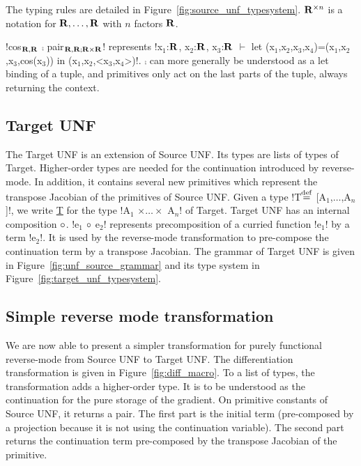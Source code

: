 The typing rules are detailed in Figure~\ref{fig:source_unf_typesystem}.
$\mathbf{R}^{\times n}$ is a notation for $\mathbf{R},\ldots,\mathbf{R}$ with $n$ factors $\mathbf{R}$.



\begin{example}
    !cos$_{\mathbf{R},\mathbf{R}}$ $\comp$ pair$_{\mathbf{R},\mathbf{R}; \mathbf{R}\times\mathbf{R}}$! 
    represents !x$_1$:$\mathbf{R}$, x$_2$:$\mathbf{R}$, x$_3$:$\mathbf{R}$ $\vdash$ let (x$_1$,x$_2$,x$_3$,x$_4$)=(x$_1$,x$_2$,x$_3$,cos(x$_3$)) in (x$_1$,x$_2$,<x$_3$,x$_4$>)!.
    $\comp$ can more generally be understood as a let binding of a tuple, and primitives only act on the last parts of the tuple, always returning the context.
\end{example}

\subsection{Target UNF} %
\label{sub:Target UNF}

The Target UNF is an extension of Source UNF. 
Its types are lists of types of Target. 
Higher-order types are needed for the continuation introduced by reverse-mode. 
In addition, it contains several new primitives which represent the transpose Jacobian of the primitives of Source UNF.
Given a type !T$\stackrel {\mathrm{def}}=$ [A$_1$,$\ldots$,A$_n$]!, we write \underline{T} for the type !A$_1$ $\times\ldots\times$ A$_n$! of Target. 
Target UNF has an internal composition $\circ$. 
!e$_{1}$ $\circ$ e$_{2}$! represents precomposition of a curried function !e$_{1}$! by a term !e$_{2}$!.
It is used by the reverse-mode transformation to pre-compose the continuation term by a transpose Jacobian.
The grammar of Target UNF is given in Figure~\ref{fig:unf_source_grammar} and its type system in Figure~\ref{fig:target_unf_typesystem}.





\subsection{Simple reverse mode transformation} %
\label{sub:Simple reverse mode transformation}

We are now able to present a simpler transformation for purely functional reverse-mode from Source UNF to Target UNF.
The differentiation transformation is given in Figure~\ref{fig:diff_macro}.
To a list of types, the transformation adds a higher-order type. 
It is to be understood as the continuation for the pure storage of the gradient.
On primitive constants of Source UNF, it returns a pair. 
The first part is the initial term (pre-composed by a projection because it is not using the continuation variable).
The second part returns the continuation term pre-composed by the transpose Jacobian of the primitive.

